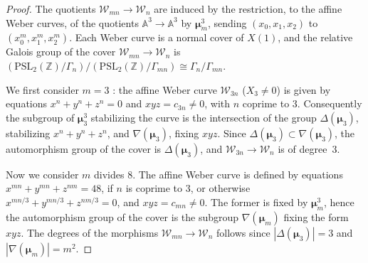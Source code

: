 \documentclass[10pt,a4paper]{amsart}
\renewcommand{\AA}{\mathbb{A}}
\newcommand{\PSL}{\mathrm{PSL}}
\newcommand{\ZZ}{\mathbb{Z}}
\newcommand{\cW}{\mathcal{W}}
\newcommand{\isom}{\cong}
\newcommand{\mmu}{\boldsymbol{\mu}}
\begin{document}
\begin{proof}
  The quotients $\cW_{mn} \to \cW_n$ are induced by the restriction, to the
  affine Weber curves, of the quotients $\AA^3 \to \AA^3$ by $\mmu_m^3$,
  sending $(x_0,x_1,x_2)$ to $(x_0^m,x_1^m,x_2^m)$.  Each Weber curve is a
  normal cover of $X(1)$, and the relative Galois group of the cover
  $\cW_{mn} \to \cW_n$ is
  $
  \left(\PSL_2(\ZZ)/\Gamma_{n}\right)/\left(\PSL_2(\ZZ)/\Gamma_{mn}\right) \isom \Gamma_{n}/\Gamma_{mn}.
  $

  We first consider $m = 3$ : the affine Weber curve $\cW_{3n}$ ($X_3 \ne 0$)
  is given by equations $x^{n}+y^{n}+z^{n} = 0$ and $x y z = c_{3n} \ne 0$,
  with $n$ coprime to $3$.
  Consequently the subgroup of $\mmu_3^3$ stabilizing the curve is the
  intersection of the group $\Delta(\mmu_3)$, stabilizing $x^n + y^n + z^n$,
  and $\nabla(\mmu_3)$, fixing $xyz$.
  Since $\Delta(\mmu_3) \subset \nabla(\mmu_3)$, the automorphism group of
  the cover is $\Delta(\mmu_3)$, and $\cW_{3n} \to \cW_n$ is of degree~$3$.

  Now we consider $m$ divides $8$. The affine Weber curve is defined by 
  equations $x^{mn} + y^{mn} + z^{nm} = 48$, if $n$ is coprime to $3$,
  or otherwise $x^{mn/3} + y^{mn/3} + z^{nm/3} = 0$, and $xyz = c_{mn} \ne 0$.
  The former is fixed by $\mmu_m^3$, hence the automorphism group of the
  cover is the subgroup $\nabla(\mmu_m)$ fixing the form $xyz$.
  The degrees of the morphisms $\cW_{mn} \to \cW_n$ follows since
  $|\Delta(\mmu_3)| = 3$ and $|\nabla(\mmu_m)| = m^2$.
\end{proof}
\end{document}
